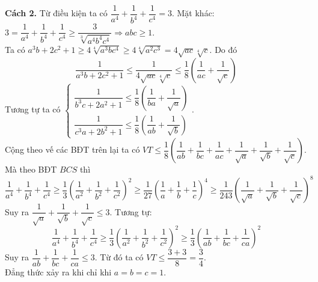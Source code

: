 \begin{ex}
{	\textbf{Cách 2.} Từ điều kiện ta có $ \dfrac{1}{a^4} + \dfrac{1}{b^4} + \dfrac{1}{c^4} = 3 $. Mặt khác: $ 3 = \dfrac{1}{a^4} + \dfrac{1}{b^4} + \dfrac{1}{c^4} \ge \dfrac{3}{\sqrt[3]{a^4b^4c^4}} \Rightarrow abc \ge 1 $.\\
	Ta có $ a^3b + 2c^2 + 1 \ge 4\sqrt[4]{a^3bc^4} \ge 4\sqrt[4]{a^2c^3} = 4\sqrt{ac}\sqrt[4]{c} $. Do đó 
	\[ \dfrac{1}{a^3b+2c^2+1} \le \dfrac{1}{4\sqrt{ac}\sqrt[4]{c}} \le \dfrac{1}{8}\left(\dfrac{1}{ac} + \dfrac{1}{\sqrt{c}}\right)  \]
	Tương tự ta có $ \begin{cases}
	\dfrac{1}{b^3c+2a^2+1} \le \dfrac{1}{8}\left(\dfrac{1}{ba} + \dfrac{1}{\sqrt{a}}\right)  \\
	\dfrac{1}{c^3a+2b^2+1} \le \dfrac{1}{8}\left(\dfrac{1}{ab} + \dfrac{1}{\sqrt{b}}\right) 
	\end{cases} $.\\
	Cộng theo vế các BĐT trên lại ta có $ VT \le \dfrac{1}{8}\left(\dfrac{1}{ab}+\dfrac{1}{bc} + \dfrac{1}{ac} + \dfrac{1}{\sqrt{a}}+\dfrac{1}{\sqrt{b}} + \dfrac{1}{\sqrt{c}} \right) $.\\
	Mà theo BĐT $ BCS $ thì $$ \dfrac{1}{a^4} + \dfrac{1}{b^4} + \dfrac{1}{c^4} \ge \dfrac{1}{3}\left( \dfrac{1}{a^2} + \dfrac{1}{b^2} + \dfrac{1}{c^2} \right)^2  \ge \dfrac{1}{27}\left(\dfrac{1}{a} + \dfrac{1}{b} + \dfrac{1}{c}\right)^4 \ge \dfrac{1}{243}\left(\dfrac{1}{\sqrt{a}} + \dfrac{1}{\sqrt{b}} + \dfrac{1}{\sqrt{c}}\right)^8 $$
	Suy ra $ \dfrac{1}{\sqrt{a}} + \dfrac{1}{\sqrt{b}} + \dfrac{1}{\sqrt{c}} \le 3 $. Tương tự:
	\[ \dfrac{1}{a^4} + \dfrac{1}{b^4} + \dfrac{1}{c^4} \ge \dfrac{1}{3}\left( \dfrac{1}{a^2} + \dfrac{1}{b^2} + \dfrac{1}{c^2} \right)^2 \ge \dfrac{1}{3}\left( \dfrac{1}{ab} + \dfrac{1}{bc} + \dfrac{1}{ca} \right)^2  \]
	Suy ra $ \dfrac{1}{ab} + \dfrac{1}{bc} + \dfrac{1}{ca} \le 3 $. Từ đó ta có $ VT \le \dfrac{3+3}{8} = \dfrac{3}{4} $.\\ 
	Đẳng thức xảy ra khi chỉ khi $ a = b= c = 1 $.
}
\end{ex}

